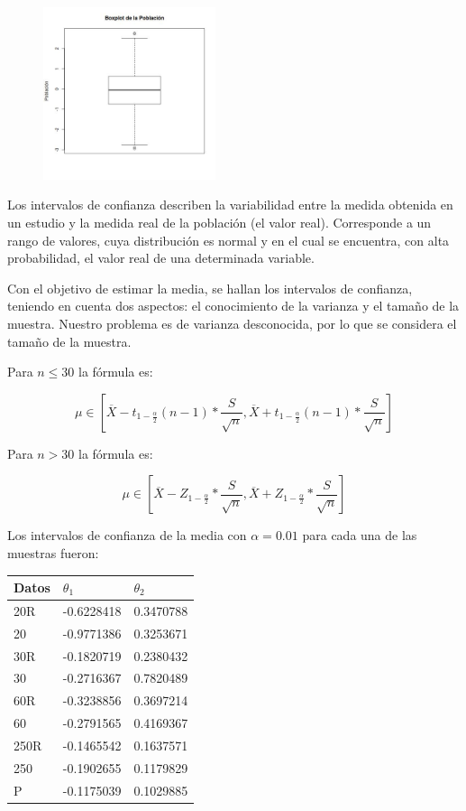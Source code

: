 \documentclass[a4paper,10pt,twocolumn]{report}
\begin{document}
	\begin{figure}[H]
		\centering
		\includegraphics[width=0.45\textwidth]{img/ex2/BoxPlots/BoxPlotsPop.jpeg}
		\label{box:2.9}
	\end{figure}

	
	Los intervalos de confianza describen la variabilidad entre la medida obtenida en un estudio y la medida real de la población (el valor real). Corresponde a un rango de valores, cuya distribución es normal y en el cual se encuentra, con alta probabilidad, el valor real de una determinada variable.
	
	Con el objetivo de estimar la media, se hallan los intervalos de confianza, teniendo en cuenta dos aspectos: el conocimiento de la varianza y el tamaño de la muestra. Nuestro problema es de varianza desconocida, por lo que se considera el tamaño de la muestra. 
	
	Para $n \leq 30$ la fórmula es:
	
	\begin{equation*}
		\mu \in [\overline{X} - t_{1-\frac{\alpha}{2}}(n-1)*\frac{S}{\sqrt{n}}, \overline{X} + t_{1-\frac{\alpha}{2}}(n-1)*\frac{S}{\sqrt{n}}]
	\end{equation*}
	
	Para $n > 30$ la fórmula es:
	
	\begin{equation*}
		\mu \in [ \overline{X} - Z_{1-\frac{\alpha}{2}}*\frac{S}{\sqrt{n}}, \overline{X} + Z_{1-\frac{\alpha}{2}}*\frac{S}{\sqrt{n}}]
	\end{equation*} 
	
	Los intervalos de confianza de la media con $\alpha=0.01$ para cada una de las muestras fueron:
	
	\begin{tabular}[h]{l|ll}
		Datos & $\theta_1$ & $\theta_2$ \\ \hline
		20R   & -0.6228418 & 0.3470788  \\
		20    & -0.9771386 & 0.3253671  \\
		30R   & -0.1820719 & 0.2380432  \\
		30    & -0.2716367 & 0.7820489  \\
		60R   & -0.3238856 & 0.3697214  \\
		60    & -0.2791565 & 0.4169367  \\
		250R  & -0.1465542 & 0.1637571  \\
		250   & -0.1902655 & 0.1179829  \\
		P     & -0.1175039 & 0.1029885
	\end{tabular}
	
\end{document}

